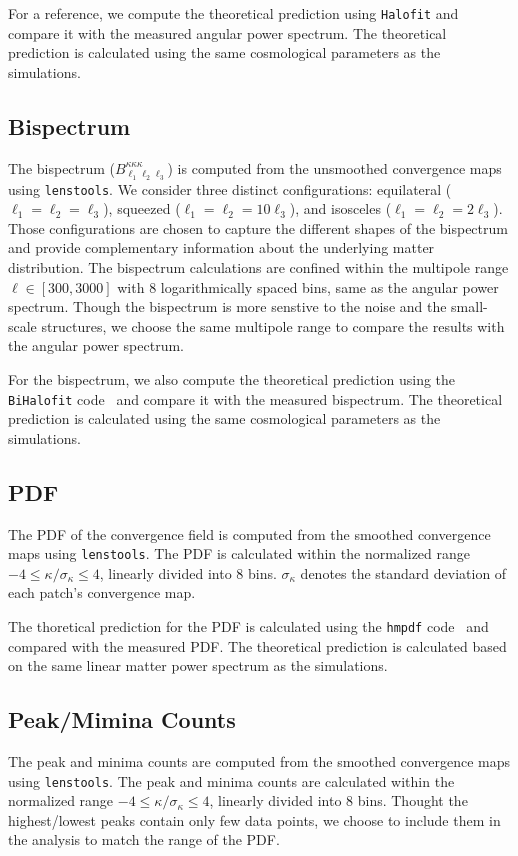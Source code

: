 For a reference, we compute the theoretical prediction using \texttt{Halofit} \citep{2012ApJ...761..152T} and compare it with the measured angular power spectrum. 
The theoretical prediction is calculated using the same cosmological parameters as the simulations. 

\subsection{Bispectrum}
The bispectrum ($B_{\ell_1\ell_2\ell_3}^{\kappa\kappa\kappa}$) is computed from the unsmoothed convergence maps using \texttt{lenstools}. We consider three distinct configurations: equilateral ($\ell_1 = \ell_2 = \ell_3$), squeezed ($\ell_1 = \ell_2 = 10\ell_3$), and isosceles ($\ell_1 = \ell_2 = 2\ell_3$). 
Those configurations are chosen to capture the different shapes of the bispectrum and provide complementary information about the underlying matter distribution.
The bispectrum calculations are confined within the multipole range $\ell \in [300, 3000]$ with $8$ logarithmically spaced bins, same as the angular power spectrum. Though the bispectrum is more senstive to the noise and the small-scale structures, we choose the same multipole range to compare the results with the angular power spectrum.

For the bispectrum, we also compute the theoretical prediction using the \texttt{BiHalofit} code~\citep{2020ApJ...895..113T} and compare it with the measured bispectrum. The theoretical prediction is calculated using the same cosmological parameters as the simulations.

\subsection{PDF}
The PDF of the convergence field is computed from the smoothed convergence maps using \texttt{lenstools}. The PDF is calculated within the normalized range $-4 \leq \kappa/\sigma_{\kappa} \leq 4$, linearly divided into 8 bins. $\sigma_{\kappa}$ denotes the standard deviation of each patch's convergence map.

The thoretical prediction for the PDF is calculated using the \texttt{hmpdf} code~\cite{2020PhRvD.102l3545T} and compared with the measured PDF. The theoretical prediction is calculated based on the same linear matter power spectrum as the simulations.

\subsection{Peak/Mimina Counts}
The peak and minima counts are computed from the smoothed convergence maps using \texttt{lenstools}. The peak and minima counts are calculated within the normalized range $-4 \leq \kappa/\sigma_{\kappa} \leq 4$, linearly divided into 8 bins. Thought the highest/lowest peaks contain only few data points, we choose to include them in the analysis to match the range of the PDF.


